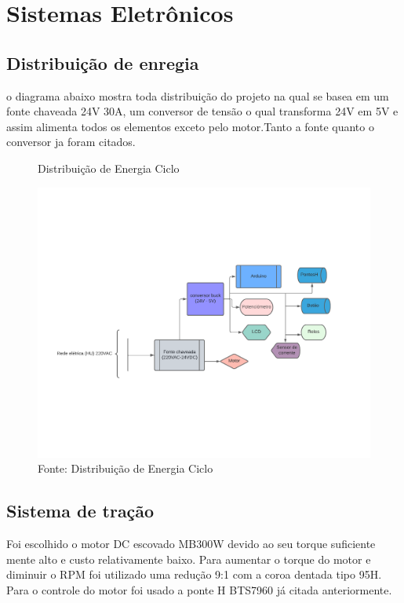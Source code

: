 \documentclass[../poliXuniversity_hospital_(USP)_report.tex]{subfiles}
\begin{document}
\section{Sistemas Eletrônicos}

\subsection{Distribuição de enregia}
o diagrama abaixo mostra toda distribuição do projeto na qual se basea em um fonte chaveada 24V 30A, um conversor de tensão o qual transforma 24V em 5V e assim alimenta todos os elementos exceto pelo motor.Tanto a fonte quanto o conversor ja foram citados.


\begin{figure}[h]
\centering
    \caption{Distribuição de Energia Ciclo}
    \centering %
    \includegraphics[width=20cm]{images/distribuiçãoenergia.pdf}
    \caption*{Fonte: Distribuição de Energia Ciclo}
    \label{figura: Distribuição de Energia Ciclo}
\end{figure}


\subsection{Sistema de tração}
Foi escolhido o motor DC escovado MB300W devido ao seu torque suficiente mente alto e custo relativamente baixo. Para aumentar o torque do motor e diminuir o RPM foi utilizado uma redução 9:1 com a coroa dentada tipo 95H. Para o controle do motor foi usado a ponte H BTS7960 já citada anteriormente.
\end{document}
